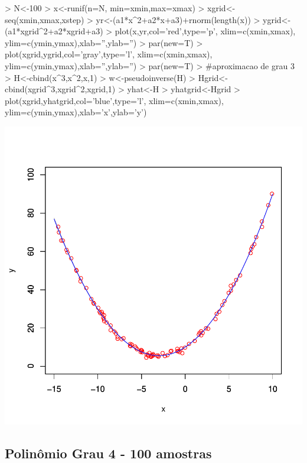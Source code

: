 \documentclass{article}
\begin{document}
\begin{Schunk}
\begin{Sinput}
>   N<-100
>   x<-runif(n=N, min=xmin,max=xmax)
>   xgrid<-seq(xmin,xmax,xstep)
>   yr<-(a1*x^2+a2*x+a3)+rnorm(length(x))
>   ygrid<-(a1*xgrid^2+a2*xgrid+a3)
>   plot(x,yr,col='red',type='p', xlim=c(xmin,xmax), ylim=c(ymin,ymax),xlab='',ylab='')
>   par(new=T)
>   plot(xgrid,ygrid,col='gray',type='l', xlim=c(xmin,xmax), ylim=c(ymin,ymax),xlab='',ylab='')
>   par(new=T)
>   #aproximacao de grau 3
>   H<-cbind(x^3,x^2,x,1)
>   w<-pseudoinverse(H) %
>   Hgrid<-cbind(xgrid^3,xgrid^2,xgrid,1)
>   yhat<-H%
>   yhatgrid<-Hgrid%
>   plot(xgrid,yhatgrid,col='blue',type='l', xlim=c(xmin,xmax), ylim=c(ymin,ymax),xlab='x',ylab='y')
\end{Sinput}
\end{Schunk}
\includegraphics{aproximacao_polinomial-012}

\newpage
\subsection{Polinômio Grau 4 - 100 amostras}
\end{document}
